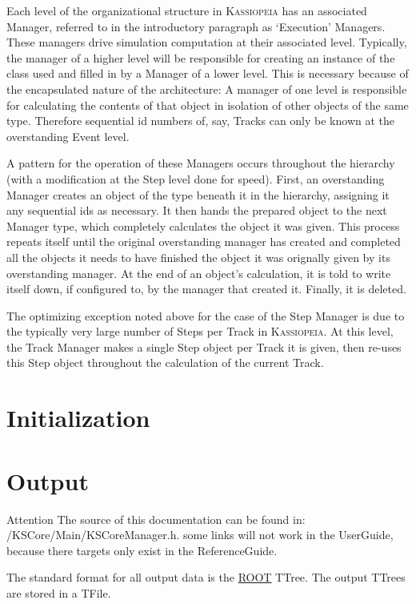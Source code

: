 Each level of the organizational structure in \textsc{Kassiopeia} has an associated Manager, referred to in the introductory paragraph as `Execution' Managers.  These managers drive simulation computation at their associated level.  Typically, the manager of a higher level will be responsible for creating an instance of the class used and filled in by a Manager of a lower level.  This is necessary because of the encapsulated nature of the architecture:  A manager of one level is responsible for calculating the contents of that object in isolation of other objects of the same type.  Therefore sequential id numbers of, say, Tracks can only be known at the overstanding Event level.

A pattern for the operation of these Managers occurs throughout the hierarchy (with a modification at the Step level done for speed).  First, an overstanding Manager creates an object of the type beneath it in the hierarchy, assigning it any sequential ids as necessary.  It then hands the prepared object to the next Manager type, which completely calculates the object it was given.  This process repeats itself until the original overstanding manager has created and completed all the objects it needs to have finished the object it was orignally given by its overstanding manager.  At the end of an object's calculation, it is told to write itself down, if configured to, by the manager that created it.  Finally, it is deleted.

The optimizing exception noted above for the case of the Step Manager is due to the typically very large number of Steps per Track in \textsc{Kassiopeia}.  At this level, the Track Manager makes a single Step object per Track it is given, then re-uses this Step object throughout the calculation of the current Track.

\section{Initialization}

\section{Output}
\begin{DoxyAttention}{Attention}
The source of this documentation can be found in: /KSCore/Main/KSCoreManager.h. some links will not work in the UserGuide, because there targets only exist in the ReferenceGuide.
\end{DoxyAttention}
The standard format for all output data is the \hyperlink{namespace_r_o_o_t}{ROOT} TTree. The output TTrees are stored in a TFile.

